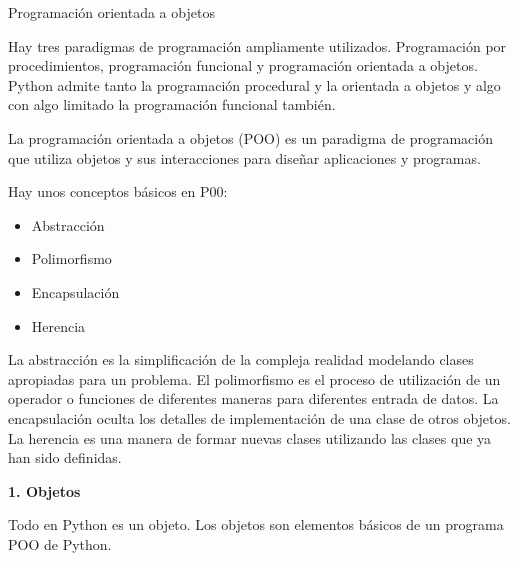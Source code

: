 \documentclass[twoside,10.5pt]{article}%
\begin{document}
\begin{center}
{\LARGE{Programaci\'on orientada a objetos}}\\[20pt]
\end{center}

\vspace{0.3cm}

Hay tres paradigmas de programaci\'on ampliamente utilizados. Programaci\'on por procedimientos, programaci\'on funcional y programaci\'on orientada a objetos. Python admite tanto  la programaci\'on procedural y la  orientada a objetos y  algo con algo limitado  la programaci\'on funcional tambi\'en.

\vspace{0.3cm}

{\color{blue} La programaci\'on orientada a objetos (POO) }es un paradigma de programaci\'on que utiliza objetos y sus interacciones para dise\~nar aplicaciones y programas.

\vspace{0.3cm}

Hay unos conceptos b\'asicos en P00:

\begin{itemize}
\item Abstracci\'on
\item Polimorfismo
\item Encapsulaci\'on
\item Herencia

\end{itemize}

\vspace{0.3cm}

La {\color{blue}abstracci\'on} es la simplificaci\'on de la compleja realidad modelando clases apropiadas para un problema. El {\color{blue}polimorfismo} es el proceso de utilizaci\'on de un operador o funciones  de diferentes maneras para diferentes  entrada de datos. La {\color{blue}encapsulaci\'on} oculta los detalles de implementaci\'on de una clase de otros objetos. La {\color{blue} herencia} es una manera de formar nuevas clases utilizando las clases que ya han sido definidas.

\vspace{0.3cm}

\textbf{1. Objetos}

Todo en Python es un objeto. Los objetos son elementos b\'asicos de un programa POO de Python.

\vspace{0.3cm}
\end{document}

